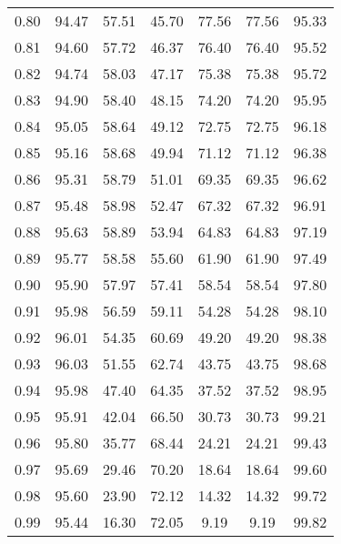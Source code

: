 \begin{tabular}{|c|c|c|c|c|c|c|}
      0.80 &     94.47 &     57.51 &      45.70 &   77.56 &      77.56 &         95.33 \\
      0.81 &     94.60 &     57.72 &      46.37 &   76.40 &      76.40 &         95.52 \\
      0.82 &     94.74 &     58.03 &      47.17 &   75.38 &      75.38 &         95.72 \\
      0.83 &     94.90 &     58.40 &      48.15 &   74.20 &      74.20 &         95.95 \\
      0.84 &     95.05 &     58.64 &      49.12 &   72.75 &      72.75 &         96.18 \\
      0.85 &     95.16 &     58.68 &      49.94 &   71.12 &      71.12 &         96.38 \\
      0.86 &     95.31 &     58.79 &      51.01 &   69.35 &      69.35 &         96.62 \\
      0.87 &     95.48 &     58.98 &      52.47 &   67.32 &      67.32 &         96.91 \\
      0.88 &     95.63 &     58.89 &      53.94 &   64.83 &      64.83 &         97.19 \\
      0.89 &     95.77 &     58.58 &      55.60 &   61.90 &      61.90 &         97.49 \\
      0.90 &     95.90 &     57.97 &      57.41 &   58.54 &      58.54 &         97.80 \\
      0.91 &     95.98 &     56.59 &      59.11 &   54.28 &      54.28 &         98.10 \\
      0.92 &     96.01 &     54.35 &      60.69 &   49.20 &      49.20 &         98.38 \\
      0.93 &     96.03 &     51.55 &      62.74 &   43.75 &      43.75 &         98.68 \\
      0.94 &     95.98 &     47.40 &      64.35 &   37.52 &      37.52 &         98.95 \\
      0.95 &     95.91 &     42.04 &      66.50 &   30.73 &      30.73 &         99.21 \\
      0.96 &     95.80 &     35.77 &      68.44 &   24.21 &      24.21 &         99.43 \\
      0.97 &     95.69 &     29.46 &      70.20 &   18.64 &      18.64 &         99.60 \\
      0.98 &     95.60 &     23.90 &      72.12 &   14.32 &      14.32 &         99.72 \\
      0.99 &     95.44 &     16.30 &      72.05 &    9.19 &       9.19 &         99.82 \\
\bottomrule
\end{tabular}
